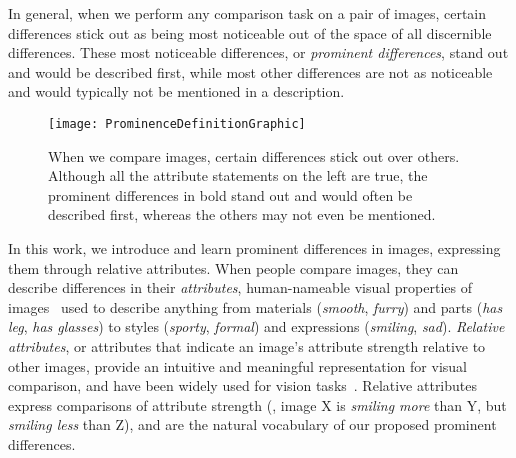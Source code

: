 \documentclass[10pt,twocolumn,letterpaper]{article}
\begin{document}
In general, when we perform any comparison task on a pair of images, certain differences stick out as being most noticeable out of the space of all discernible differences. These most noticeable differences, or \textit{prominent differences}, stand out and would be described first, while most other differences are not as noticeable and would typically not be mentioned in a description.

\begin{figure}
    \centering
    \captionsetup[subfigure]{justification=centering,font=footnotesize,labelfont=footnotesize}
    \texttt{[image: ProminenceDefinitionGraphic]}
    \caption[Prominent Differences]{When we compare images, certain differences stick out over others. Although all the attribute statements on the left are true, the prominent differences in bold stand out and would often be described first, whereas the others may not even be mentioned.}
    \label{fig:prominentdifferencesdefinition}
\end{figure}

In this work, we introduce and learn prominent differences in images, expressing them through relative attributes. When people compare images, they can describe differences in their \textit{attributes}, human-nameable visual properties of images~\cite{describingobjects, zeroshot, whittlesearch, simile, relativeattributes, dominance, deepfashion} used to describe anything from materials (\textit{smooth}, \textit{furry}) and parts (\textit{has leg}, \textit{has glasses}) to styles (\textit{sporty}, \textit{formal}) and expressions (\textit{smiling}, \textit{sad}). \textit{Relative attributes}, or attributes that indicate an image's attribute strength relative to other images, provide an intuitive and meaningful representation for visual comparison, and have been widely used for vision tasks~\cite{virality, whittlesearch, partattribute, finegrained, jnd, deeprelative, deeprelative2, deeprelative3, spokenattributes}. Relative attributes express comparisons of attribute strength (\eg, image X is \textit{smiling more} than Y, but \textit{smiling less} than Z), and are the natural vocabulary of our proposed prominent differences.
\end{document}
